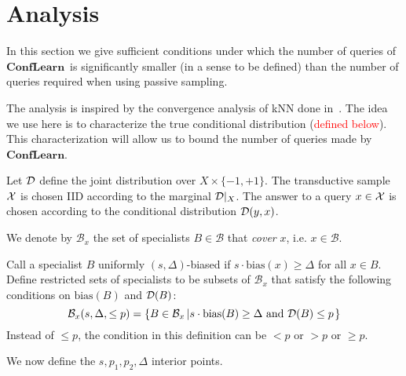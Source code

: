 \documentclass{article}
\newcommand{\X}{{\cal X}}
\newcommand{\D}{{\cal D}}
\newcommand{\cB}{\mathcal{B}}
\newcommand{\bias}{\text{bias}}
\newcommand{\new}[1]{\textcolor{red}{#1}}
\newcommand{\ActiveLearn}{$\mathbf{ConfLearn}$}
\newcommand{\comment}[3]{\marginpar{\textcolor{#2}{#1: #3}}}
\newcommand{\shay}[1]{\comment{Shay}{red}{#1}}
\begin{document}
\section{Analysis}


In this section we give sufficient conditions under which
the number of queries of \ActiveLearn\ is significantly smaller (in a
sense to be defined) than the number of queries required when using
passive sampling.

The analysis is inspired by the convergence analysis of kNN done
in~\cite{ChadhuriDasgupta2015}.  The idea we use here is to
characterize the true conditional distribution (\new{defined below}). This characterization
will allow us to bound the number of queries made by \ActiveLearn.

Let $\D$ define the joint distribution over $X \times \{-1,+1\}$. The
transductive sample $\X$ is chosen IID according to the marginal
$\D|_{X}$. The answer to a query $x \in \X$ is chosen according to the
conditional distribution $\D(y,x)$.

\newcommand{\restricted}[2]{{#1}(#2)}

We denote by $\cB_x$ the set of specialists $B \in \cB$ that {\em
  cover} $x$, i.e. $x \in \cB$.


Call a specialist $B$ uniformly $(s,\Delta)$-biased if $s\cdot\bias(x) \geq \Delta$ for all $x \in B$.
Define restricted sets of specialists to be subsets of $\cB_x$ that
satisfy the following conditions on $\bias(B)$ and $\D(B)$:
\[ \restricted{\cB_x}{s,\Delta,\leq p}
=
\left\{
B \in \cB_{x} \left| s \cdot\bias(B) \geq \Delta \mbox{ and } \D(B) \leq p
\right.\right\}
\]
Instead of $\leq p$, the condition in this definition can be
$<p$ or $>p$ or $\geq p$.

We now define the $s,p_1,p_2,\Delta$ interior points.
\end{document}
